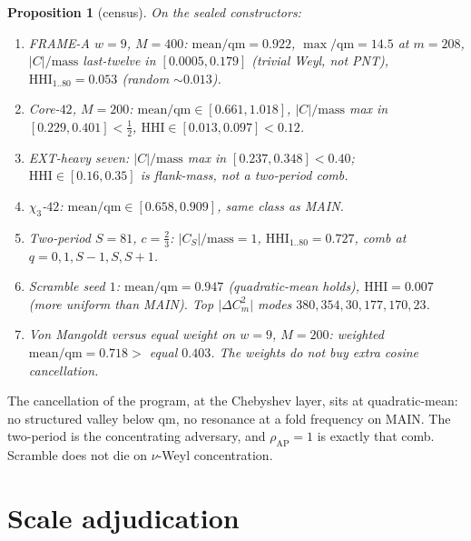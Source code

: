 \documentclass[11pt]{article}
\newtheorem{prop}{Proposition}
\theoremstyle{remark}
\begin{document}
\begin{prop}[census]\label{prop:spectrum}
On the sealed constructors:
\begin{enumerate}
\item FRAME-A $w=9$, $M=400$:
$\mathrm{mean}/{\mathrm{qm}}=0.922$,
$\max/{\mathrm{qm}}=14.5$ at $m=208$,
$\lvert C\rvert/\mathrm{mass}$ last-twelve in $[0.0005,0.179]$
(trivial Weyl, not PNT),
$\mathrm{HHI}_{1..80}=0.053$ (random $\sim0.013$).
\item Core-$42$, $M=200$:
$\mathrm{mean}/{\mathrm{qm}}\in[0.661,1.018]$,
$\lvert C\rvert/\mathrm{mass}$ max in $[0.229,0.401]<\tfrac12$,
$\mathrm{HHI}\in[0.013,0.097]<0.12$.
\item EXT-heavy seven:
$\lvert C\rvert/\mathrm{mass}$ max in $[0.237,0.348]<0.40$;
$\mathrm{HHI}\in[0.16,0.35]$ is flank-mass, not a two-period comb.
\item $\chi_3$-$42$: $\mathrm{mean}/{\mathrm{qm}}\in[0.658,0.909]$,
same class as MAIN.
\item Two-period $S=81$, $c=\tfrac23$:
$\lvert C_S\rvert/\mathrm{mass}=1$,
$\mathrm{HHI}_{1..80}=0.727$,
comb at $q=0,1,S-1,S,S+1$.
\item Scramble seed $1$: $\mathrm{mean}/{\mathrm{qm}}=0.947$
(quadratic-mean holds), $\mathrm{HHI}=0.007$ (more uniform than MAIN).
Top $\lvert\Delta C_m^2\rvert$ modes $380,354,30,177,170,23$.
\item Von Mangoldt versus equal weight on $w=9$, $M=200$:
weighted $\mathrm{mean}/{\mathrm{qm}}=0.718>$ equal $0.403$.
The weights do not buy extra cosine cancellation.
\end{enumerate}
\end{prop}

The cancellation of the program, at the Chebyshev layer, sits at
quadratic-mean: no structured valley below $\mathrm{qm}$, no
resonance at a fold frequency on MAIN.
The two-period is the concentrating adversary, and $\rho_{\mathrm{AP}}=1$
is exactly that comb.
Scramble does not die on $\nu$-Weyl concentration.

\section{Scale adjudication}\label{sec:scale}
\end{document}
